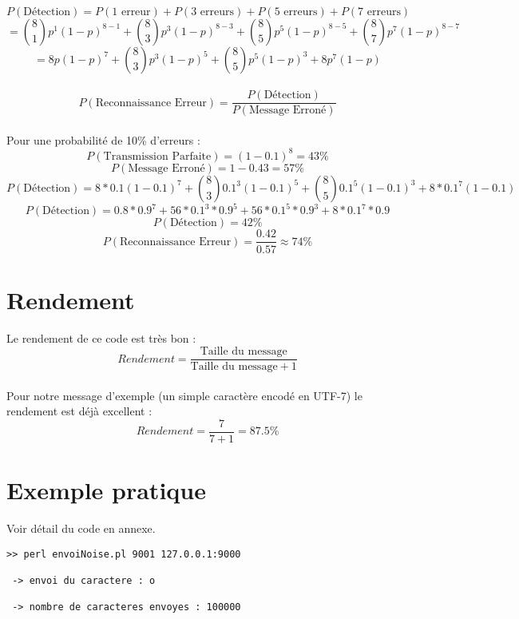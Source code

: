         \paragraph{}
\[  P(\text{Détection}) = P(\text{1 erreur}) + P(\text{3 erreurs}) + P(\text{5 erreurs}) + P(\text{7 erreurs}) \]
\[ = {8\choose 1}p^1(1-p)^{8-1} + {8\choose 3}p^3(1-p)^{8-3} + {8\choose 5}p^5(1-p)^{8-5} + {8\choose 7}p^7(1-p)^{8-7} \]
\[ = 8p(1-p)^7 + {8\choose 3}p^3(1-p)^5 + {8\choose 5}p^5(1-p)^3 + 8p^7(1-p) \]
        \paragraph{}
\[  P(\text{Reconnaissance Erreur}) = \frac{P(\text{Détection})}{P(\text{Message Erroné})}\]
        \paragraph{}
Pour une probabilité de 10\% d'erreurs :
\[  P(\text{Transmission Parfaite}) = (1-0.1)^{8} = 43\%\]
\[  P(\text{Message Erroné}) = 1 - 0.43 = 57\% \]
\[  P(\text{Détection}) = 8*0.1(1-0.1)^7 + {8\choose 3}0.1^3(1-0.1)^5 + {8\choose 5}0.1^5(1-0.1)^3 + 8*0.1^7(1-0.1) \]
\[  P(\text{Détection}) = 0.8*0.9^7 + 56*0.1^3*0.9^5 + 56*0.1^5*0.9^3 + 8*0.1^7*0.9 \]
\[  P(\text{Détection}) = 42\% \]
\[  P(\text{Reconnaissance Erreur}) = \frac{0.42}{0.57} \approx 74\% \]


    \section{Rendement}

        \paragraph{}
Le rendement de ce code est très bon :
\[  Rendement = \frac{\text{Taille du message}}{\text{Taille du message}+1} \]
        \paragraph{}
Pour notre message d'exemple (un simple caractère encodé en UTF-7) le rendement est déjà excellent :
\[  Rendement = \frac{7}{7+1} = 87.5\% \]


    \section{Exemple pratique}

        \lstset{
            language=bash, basicstyle=\ttfamily\small, columns=flexible,
            tabsize=2, extendedchars=true, showspaces=false,
            showstringspaces=false, numbers=left, numberstyle=\tiny,
            breaklines=true, breakautoindent=true, captionpos=b
        }
Voir détail du code en annexe.
        \begin{lstlisting}
>> perl envoiNoise.pl 9001 127.0.0.1:9000

 -> envoi du caractere : o

 -> nombre de caracteres envoyes : 100000

        \end{lstlisting}

